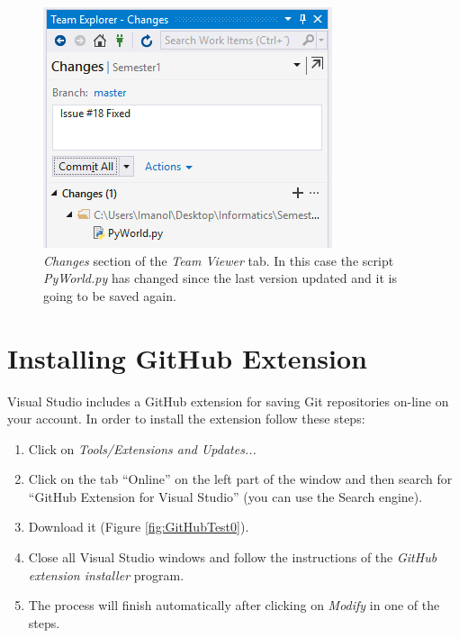 \begin{figure}[h]
    \centering
    \includegraphics[width=0.5 \textwidth]{Figures/GCV2.png}
    \caption{\textit{Changes} section of the \textit{Team Viewer} tab. In this case the script \textit{PyWorld.py} has changed since the last version updated and it is going to be saved again.}
    \label{fig:GitCommit0}
\end{figure}


    \FloatBarrier
    \section{Installing GitHub Extension}

Visual Studio includes a GitHub extension for saving Git repositories on-line on your account. In order to install the extension follow these steps:

\begin{enumerate}
	\item Click on \textit{Tools/Extensions and Updates...}
	\item Click on the tab ``Online'' on the left part of the window and then search for ``GitHub Extension for Visual Studio'' (you can use the Search engine).
    \item Download it (Figure \ref{fig:GitHubTest0}).
	\item Close all Visual Studio windows and follow the instructions of the \textit{GitHub extension installer} program.
    \item The process will finish automatically after clicking on \textit{Modify} in one of the steps.
\end{enumerate}

